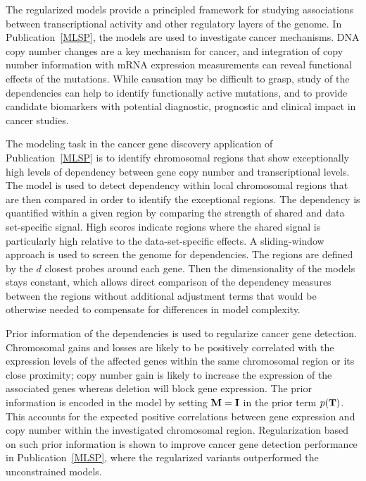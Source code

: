 The regularized models provide a principled framework for studying
associations between transcriptional activity and other regulatory
layers of the genome. In Publication~\ref{MLSP}, the models are used
to investigate cancer mechanisms. DNA copy number changes are a key
mechanism for cancer, and integration of copy number information with
mRNA expression measurements can reveal functional effects of the
mutations. While causation may be difficult to grasp, study of the
dependencies can help to identify functionally active mutations, and
to provide candidate biomarkers with potential diagnostic, prognostic
and clinical impact in cancer studies.

The modeling task in the cancer gene discovery application of
Publication~\ref{MLSP} is to identify chromosomal regions that show
exceptionally high levels of dependency between gene copy number and
transcriptional levels.  The model is used to detect dependency within
local chromosomal regions that are then compared in order to identify
the exceptional regions. The dependency is quantified within a given
region by comparing the strength of shared and data set-specific
signal. High scores indicate regions where the shared signal is
particularly high relative to the data-set-specific effects.  A
sliding-window approach is used to screen the genome for
dependencies. The regions are defined by the \(d\) closest probes
around each gene. Then the dimensionality of the models stays
constant, which allows direct comparison of the dependency measures
between the regions without additional adjustment terms that would be
otherwise needed to compensate for differences in model complexity.

Prior information of the dependencies is used to regularize cancer
gene detection. Chromosomal gains and losses are likely to be
positively correlated with the expression levels of the affected genes
within the same chromosomal region or its close proximity; copy number
gain is likely to increase the expression of the associated genes
whereas deletion will block gene expression.  The prior information is
encoded in the model by setting \(\mathbf{M} = \mathbf{I}\) in the prior term
\(p(\mathbf{T})\). This accounts for the expected positive correlations
between gene expression and copy number within the investigated
chromosomal region. Regularization based on such prior information is
shown to improve cancer gene detection performance in
Publication~\ref{MLSP}, where the regularized variants outperformed
the unconstrained models.

